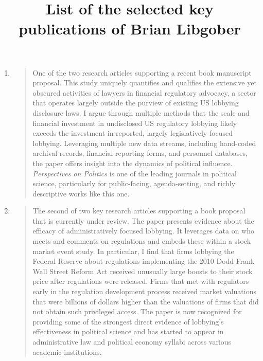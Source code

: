\documentclass[12pt]{article}
\title{\large\bfseries List of the selected key publications of Brian Libgober}
\date{}
\begin{document}
\maketitle
\vspace{-20mm} %

\begin{enumerate}
\item {}

\begin{quote}
 One of the two research articles supporting a recent book manuscript proposal. This study uniquely quantifies and qualifies the extensive yet obscured activities of lawyers in financial regulatory advocacy, a sector that operates largely outside the purview of existing US lobbying disclosure laws. I argue through multiple methods that the scale and financial investment in undisclosed US regulatory lobbying likely exceeds the investment in reported, largely legislatively focused lobbying. Leveraging multiple new data streams, including hand-coded archival records, financial reporting forms, and personnel databases, the paper offers insight into the dynamics of political influence. \emph{Perspectives on Politics} is one of the leading journals in political science, particularly for public-facing, agenda-setting, and richly descriptive works like this one. 
\end{quote}


\item {}

\begin{quote}
The second of two key research articles supporting a book proposal that is currently under review. The paper presents evidence about the efficacy of administratively focused lobbying. It leverages data on who meets and comments on regulations and embeds these within a stock market event study. In particular, I find that firms lobbying the Federal Reserve about regulations implementing the 2010 Dodd Frank Wall Street Reform Act received unusually large boosts to their stock price after regulations were released. Firms that met with regulators early in the regulation development process received market valuations that were billions of dollars higher than the valuations of firms that did not obtain such privileged access.  The paper is now recognized for providing some of the strongest direct evidence of lobbying's effectiveness in political science and has started to appear in administrative law and political economy syllabi across various academic institutions. 
\end{quote}


\end{enumerate}
\end{document}

